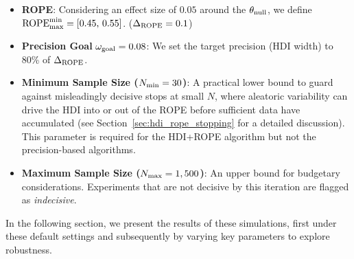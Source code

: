 \begin{itemize}
    \item \textbf{ROPE}: Considering an effect size of $0.05$ around the $\theta_{\rm null}$, we define $\mathrm{ROPE}_{\rm max}^{\rm min}=[0.45,\,0.55]$. ($\Delta_{\rm ROPE}=0.1$)
    \item \textbf{Precision Goal} $\omega_{\rm goal}=0.08$: We set the target precision (HDI width) to 80\% of $\Delta_{\rm ROPE}$.
    \item \textbf{Minimum Sample Size ($N_{\rm min}=30$)}: A practical lower bound to guard against misleadingly decisive stops at small $N$, where aleatoric variability can drive the HDI into or out of the ROPE before sufficient data have accumulated (see Section~\ref{sec:hdi_rope_stopping} for a detailed discussion).
    This parameter is required for the HDI+ROPE algorithm but not the precision-based algorithms.
    \item \textbf{Maximum Sample Size ($N_{\rm max}=1,500$)}: An upper bound for budgetary considerations. Experiments that are not decisive by this iteration are flagged as \textit{indecisive}.
\end{itemize}

In the following section, we present the results of these simulations, first under these default settings and subsequently by varying key parameters to explore robustness.